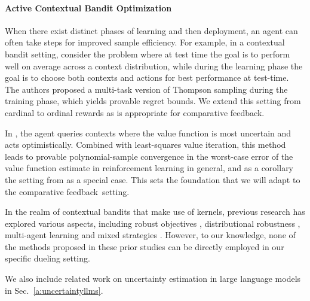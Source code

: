 \documentclass{article} \usepackage{iclr2023_conference,times}
\newcommand{\add}[1]{#1}
\begin{document}
\paragraph{\add{Active} Contextual Bandit Optimization}
When there exist distinct phases of learning and then deployment, an agent can often take steps for improved sample efficiency.
For example, in a contextual bandit setting, \citet{char_ocbo}
consider the problem where at test time the goal is to perform well on average across a context distribution, while during the learning phase the goal is to choose both contexts and actions for best performance at test-time.
The authors proposed a multi-task version of Thompson sampling during the training phase, which yields provable regret bounds. We extend this setting from cardinal to ordinal rewards as is appropriate for comparative feedback.

In \citet{li2023nearoptimal}, the agent queries contexts where the value function is most uncertain and acts optimistically. Combined with least-squares value iteration, this method leads to provable polynomial-sample convergence in the worst-case error of the value function estimate in reinforcement learning in general, and as a corollary the setting from \citet{char_ocbo} as a special case. This sets the foundation that we will adapt to the comparative feedback~setting.

In the realm of  contextual bandits that make use of kernels, previous research has explored various aspects, including robust objectives \citep{bogunovic2018adversarially}, distributional robustness \citep{kirschner2020distributionally, ramesh2023distributionally}, multi-agent learning and mixed strategies \citep{sessa2019noregret, sessa2020mixed}. However, to our knowledge, none of the methods proposed in these prior studies can be directly employed in our specific dueling setting.

We also include related work on uncertainty estimation in large language models in Sec.~\ref{a:uncertaintyllms}.
 \vspace{-2mm}
\end{document}
